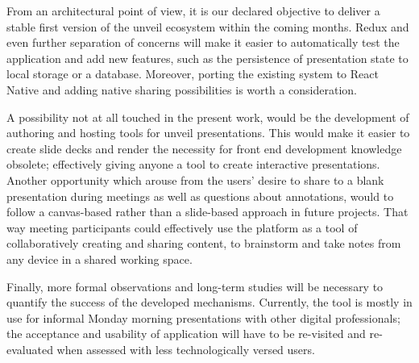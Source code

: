 From an architectural point of view, it is our declared objective to deliver a stable first version of the unveil ecosystem within the coming months. Redux and even further separation of concerns will make it easier to automatically test the application and add new features, such as the persistence of presentation state to local storage or a database. Moreover, porting the existing system to React Native and adding native sharing possibilities is worth a consideration.

A possibility not at all touched in the present work, would be the development of authoring and hosting tools for unveil presentations. This would make it easier to create slide decks and render the necessity for front end development knowledge obsolete; effectively giving anyone a tool to create interactive presentations.
Another opportunity which arouse from the users' desire to share to a blank presentation during meetings as well as questions about annotations, would to follow a canvas-based rather than a slide-based approach in future projects. That way meeting participants could effectively use the platform as a tool of collaboratively creating and sharing content, to brainstorm and take notes from any device in a shared working space.

Finally, more formal observations and long-term studies will be necessary to quantify the success of the developed mechanisms. Currently, the tool is mostly in use for informal Monday morning presentations with other digital professionals; the acceptance and usability of application will have to be re-visited and re-evaluated when assessed with less technologically versed users.